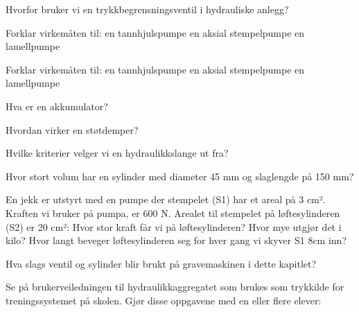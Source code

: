 \documentclass[12pt,a4paper]{article}
\def\oppgave{
		}
\begin{document}
\vskip 2.5pt 
\oppgave{}%
\vskip 2.5pt 
Hvorfor bruker vi en trykkbegrensningsventil i hydrauliske anlegg?
\vskip 5pt 
\vskip 2.5pt 
Forklar virkemåten til:
	en tannhjulspumpe
	en aksial stempelpumpe
	en lamellpumpe
\oppgave{}%
\vskip 2.5pt 
Forklar virkemåten til:
	en tannhjulspumpe
	en aksial stempelpumpe
	en lamellpumpe
\vskip 5pt 
\vskip 2.5pt 
\oppgave{}%
\vskip 2.5pt 
Hva er en akkumulator?
\vskip 5pt 
\vskip 2.5pt 
\oppgave{}%
\vskip 2.5pt 
Hvordan virker en støtdemper?
\vskip 5pt 
\vskip 2.5pt 
\oppgave{}%
\vskip 2.5pt 
Hvilke kriterier velger vi en hydraulikkslange ut fra?
\vskip 5pt 
\vskip 2.5pt 
\oppgave{}%
\vskip 2.5pt 
Hvor stort volum har en sylinder med diameter 45 mm og slaglengde på 150 mm?
\vskip 5pt 
\vskip 2.5pt 
\oppgave{}%
\vskip 2.5pt 
En jekk er utstyrt med en pumpe der stempelet (S1) har et areal på 3 cm². Kraften vi bruker på pumpa, er 600 N. Arealet til stempelet på løftesylinderen (S2) er 20 cm²:
	Hvor stor kraft får vi på løftesylinderen?
	Hvor mye utgjør det i kilo?
	Hvor langt beveger løftesylinderen seg for hver gang vi skyver S1 8cm inn?
\vskip 5pt 
\vskip 2.5pt 
\oppgave{}%
\vskip 2.5pt 
Hva slags ventil og sylinder blir brukt på gravemaskinen i dette kapitlet?
\vskip 5pt 
\vskip 2.5pt 
\oppgave{}%
\vskip 2.5pt 
Se på brukerveiledningen til hydraulikkaggregatet som brukes som trykkilde for treningssystemet på skolen. Gjør disse oppgavene med en eller flere elever:
\end{document}
